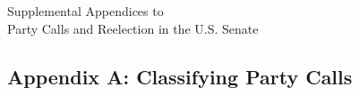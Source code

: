 \documentclass[12pt]{article}
\begin{document}
\doublespacing

\setcounter{table}{0}
\setcounter{footnote}{0}
\setcounter{figure}{0}
\setcounter{page}{0}


\begin{center}
\vspace*{1in}
{\Large Supplemental Appendices to\\}
{\LARGE Party Calls and Reelection in the U.S. Senate}
\end{center}
\vspace*{1in}

\thispagestyle{empty}

\setcounter{tocdepth}{1}
\setcounter{secnumdepth}{0}
\tableofcontents

\renewcommand\thetable{A\arabic{table}}
\renewcommand\thepage{A\arabic{page}}

\clearpage

\subsection*{Appendix A: Classifying Party Calls}
%
\end{document}
